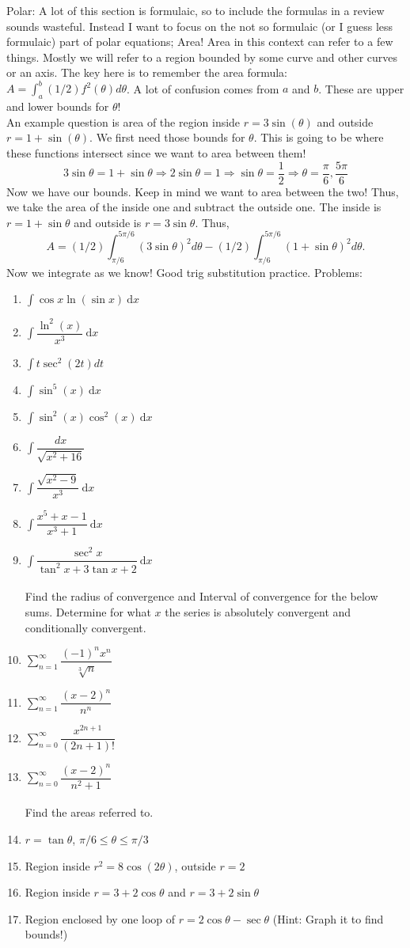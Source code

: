 \documentclass[10pt]{article}
\newcommand{\ds}{\displaystyle}
\newcommand{\dx}{\:\mathrm{d}x}
\theoremstyle{Theorem}
\theoremstyle{definition}
\theoremstyle{remark}
\theoremstyle{custom}
\begin{document}
Polar: A lot of this section is formulaic, so to include the formulas in a review sounds wasteful. Instead I want to focus on the not so formulaic (or I guess less formulaic) part of polar equations; Area! Area in this context can refer to a few things. Mostly we will refer to a region bounded by some curve and other curves or an axis. The key here is to remember the area formula: $A=\ds \int_a^b (1/2)f^2(\theta) d\theta$. A lot of confusion comes from $a$ and $b$. These are upper and lower bounds for $\theta$! \\
An example question is area of the region inside $r=3\sin(\theta)$ and outside $r=1+\sin(\theta)$. We first need those bounds for $\theta$. This is going to be where these functions intersect since we want to area between them! 
\[
3\sin\theta=1+\sin\theta\Rightarrow 2 \sin\theta=1\Rightarrow \sin\theta =\dfrac{1}{2}\Rightarrow \theta=\dfrac{\pi}{6}, \dfrac{5\pi}{6}
\]
Now we have our bounds. Keep in mind we want to area between the two! Thus, we take the area of the inside one and subtract the outside one. The inside is $r=1+\sin\theta$ and outside is $r=3\sin\theta$. Thus,
\[
A=(1/2)\int_{\pi/6}^{5\pi/6} (3\sin\theta)^2d \theta - (1/2)\int_{\pi/6}^{5\pi/6}(1+\sin\theta)^2d\theta.
\]
Now we integrate as we know! Good trig substitution practice.
\newpage
\noindent Problems: 
\begin{enumerate}[1.]
\item $\ds \int \cos x \ln(\sin x)\dx$
\item $\ds \int \dfrac{\ln^2(x)}{x^3}\dx$
\item $\ds \int t\sec^2(2t)dt$
\item $\ds\int \sin^5(x)\dx$
\item $\ds \int \sin^2(x)\cos^2(x)\dx$
\item $\ds\int \dfrac{dx}{\sqrt{x^2+16}}$
\item $\ds \int \dfrac{\sqrt{x^2-9}}{x^3}\dx$
\item $\ds \int \dfrac{x^5+x-1}{x^3+1}\dx$
\item $\ds \int \dfrac{\sec^2x}{\tan^2x+3\tan x +2}\dx$\\\\
Find the radius of convergence and Interval of convergence for the below sums. Determine for what $x$ the series is absolutely convergent and conditionally convergent.
\item $\ds \sum_{n=1}^{\infty}\dfrac{(-1)^nx^n}{\sqrt[3]{n}}$
\item $\ds \sum_{n=1}^{\infty}\dfrac{(x-2)^n}{n^n}$
\item $\ds\sum_{n=0}^{\infty}\dfrac{x^{2n+1}}{(2n+1)!}$
\item $\ds \sum_{n=0}^{\infty}\dfrac{(x-2)^n}{n^2+1}$\\\\
Find the areas referred to.
\item $r=\tan\theta $, $\pi/6\leq \theta\leq \pi/3$
\item Region inside $r^2=8\cos(2\theta)$, outside $r=2$
\item Region inside $r=3+2\cos\theta$ and $r=3+2\sin\theta$
\item Region enclosed by one loop of $r=2\cos\theta -\sec\theta$ (Hint: Graph it to find bounds!)
\end{enumerate}
\end{document}
